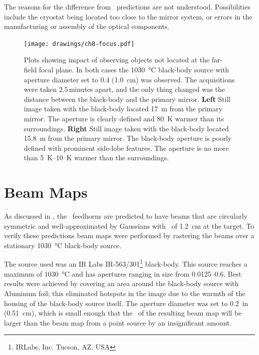 The reasons for the difference from \ZEMAX\ predictions are not understood.
Possibilities include the cryostat being located too close to the mirror system, or errors in the manufacturing or assembly of the optical components.

\begin{figure}
\centering
\texttt{[image: drawings/ch8-focus.pdf]}
\caption[Focus distance plots]{
  Plots showing impact of observing objects not located at the far-field focal plane.
  In both cases the \SI{1030}{\celsius} black-body source with aperture diameter set to \SI{0.4}{\in} (\SI{1.0}{\cm}) was observed. The acquisitions were taken 2.5\,minutes apart, and the only thing changed was the distance between the black-body and the primary mirror.
  \textbf{Left} Still image taken with the black-body located \SI{17}{\m} from the primary mirror.
  The aperture is clearly defined and \SI{80}{\K} warmer than its surroundings.
  \textbf{Right} Still image taken with the black-body located \SI{15.8}{\m} from the primary mirror.
  The black-body aperture is poorly defined with prominent side-lobe features.
  The aperture is no more than \SIrange{5}{10}{\K} warmer than the surroundings.
}
\label{fig:ch8-focus}
\end{figure}

\section{Beam Maps} \label{sec:ch8-beam-maps}

As discussed in , the \Imager\ feedhorns are predicted to have beams that are circularly symmetric and well-approximated by Gaussians with \FWHM\ of \SI{1.2}{\cm} at the target.
To verify these predictions beam maps were performed by rastering the beams over a stationary \SI{1030}{\celsius} black-body source.

The source used was an IR Labs IR-563/301\footnote{IRLabs, Inc. Tucson, AZ. USA} black-body.
This source reaches a maximum of \SI{1030}{\celsius} and has apertures ranging in size from \SIrange{0.0125}{0.6}{\in}.
Best results were achieved by covering an area around the black-body source with Aluminum foil; this eliminated hotspots in the image due to the warmth of the housing of the black-body source itself.
The aperture diameter was set to \SI{0.2}{in} (\SI{0.51}{\cm}), which is small enough that the \FWHM\ of the resulting beam map will be larger than the beam map from a point source by an insignificant amount.

